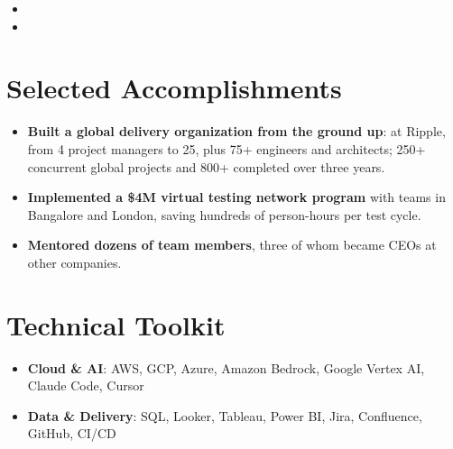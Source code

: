 \documentclass[11pt,letterpaper,sans]{moderncv}
\begin{document}
\begin{itemize}
\item{}

\vspace{3pt}

\item{}

\end{itemize}


\section{Selected Accomplishments}
\vspace{1pt}
\begin{itemize}
\item {\textbf{Built a global delivery organization from the ground up}: at Ripple, from 4 project managers to 25, plus 75+ engineers and architects; 250+ concurrent global projects and 800+ completed over three years.}
\item {\textbf{Implemented a \$4M virtual testing network program} with teams in Bangalore and London, saving hundreds of person-hours per test cycle.}
\item {\textbf{Mentored dozens of team members}, three of whom became CEOs at other companies.}
\end{itemize}


\section{Technical Toolkit}
\vspace{1pt}
\begin{itemize}
\item{\textbf{Cloud \& AI}: AWS, GCP, Azure, Amazon Bedrock, Google Vertex AI, Claude Code, Cursor}
\item{\textbf{Data \& Delivery}: SQL, Looker, Tableau, Power BI, Jira, Confluence, GitHub, CI/CD}
\end{itemize}
\end{document}
